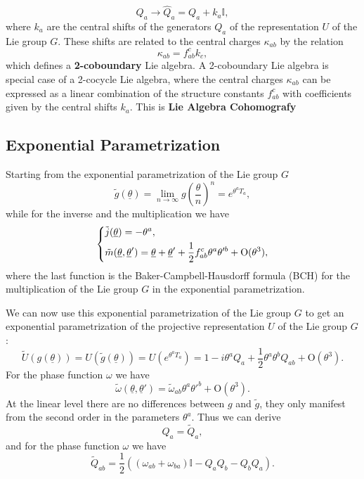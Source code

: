 \[
    Q_a \to \hat{Q}_a = Q_a + k_a \mathbb{I},
\]
where \(k_a\) are the central shifts of the generators \(Q_a\) of the representation \(U\) of the Lie group \(G\). These shifts are related to the central charges \(\kappa_{ab}\) by the relation
\[
    \kappa_{ab} = f^c_{ab} k_c,
\]
which defines a \textbf{2-coboundary} Lie algebra. A 2-coboundary Lie algebra is special case of a 2-cocycle Lie algebra, where the central charges \(\kappa_{ab}\) can be expressed as a linear combination of the structure constants \(f^c_{ab}\) with coefficients given by the central shifts \(k_a\).
This is \textbf{Lie Algebra Cohomografy}

\subsection{Exponential Parametrization}

Starting from the exponential parametrization of the Lie group \(G\)
\[
    \tilde{g}(\underline{\theta}) = \lim_{n \to \infty} g(\frac{\theta}{n})^n = e^{\theta^a T_a},
\]
while for the inverse and the multiplication we have
\[
    \begin{dcases}
        \tilde{j}(\underline{\theta}) = - \theta^a, \\
        \tilde{m}(\underline{\theta}, \underline{\theta}') = \underline{\theta} + \underline{\theta}' + \frac{1}{2} f_{ab}^c \theta^a \theta'^b + \mathrm{O}(\theta^3),
    \end{dcases}
\]
where the last function is the Baker-Campbell-Hausdorff formula (BCH) for the multiplication of the Lie group \(G\) in the exponential parametrization.

We can now use this exponential parametrization of the Lie group \(G\) to get an exponential parametrization of the projective representation \(U\) of the Lie group \(G\):
\[
    \tilde{U}(g(\underline{\theta})) = U(\tilde{g}(\underline{\theta})) = U(e^{\theta^a T_a}) = 1- i \theta^a Q_a + \frac{1}{2} \theta^a \theta^b Q_{ab} + \mathrm{O}(\theta^3).
\]
For the phase function \(\omega\) we have
\[
    \tilde{\omega}(\underline{\theta}, \underline{\theta}') = \tilde{\omega}_{ab} \theta^a \theta'^b + \mathrm{O}(\theta^3).
\]
At the linear level there are no differences between \(g\) and \(\tilde{g}\), they only manifest from the second order in the parameters \(\theta^a\). Thus we can derive
\[
    Q_a = \tilde{Q}_a,
\]
and for the phase function \(\omega\) we have
\[
    \tilde{Q}_{ab} = \frac{1}{2}( (\omega_{ab} + \omega_{ba}) \mathbb{I} - Q_a Q_b - Q_b Q_a).
\]

